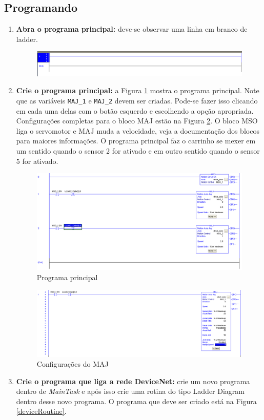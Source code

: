 \documentclass[a4paper,11pt]{scrartcl} %
\numberwithin{equation}{section} %
\numberwithin{figure}{section} %
\numberwithin{table}{section} %
\begin{document}
\subsection{Programando}
\begin{enumerate}
	\item \textbf{Abra o programa principal: } deve-se observar uma linha em branco de ladder.
	\begin{figure}[H]
       \centering
              \includegraphics[width=0.8\linewidth]{figures/software/step14}
          \end{figure}
     \item \textbf{Crie o programa principal: } a Figura \ref{mainRoutine} mostra o programa principal. Note que as variáveis \texttt{MAJ\_1} e \texttt{MAJ\_2} devem ser criadas. Pode-se fazer isso clicando em cada uma delas com o botão esquerdo e escolhendo a opção apropriada. Configurações completas para o bloco MAJ estão na Figura \ref{majConf}. O bloco MSO liga o servomotor e MAJ muda a velocidade, veja a documentação dos blocos para maiores informações. O programa principal faz o carrinho se mexer em um sentido quando o sensor 2 for ativado e em outro sentido quando o sensor 5 for ativado.
     \begin{figure}[H]
       \centering
              \includegraphics[width=0.9\linewidth]{figures/software/step16}
              \caption{Programa principal\label{mainRoutine}}
          \end{figure}
        \begin{figure}[H]
       \centering
              \includegraphics[width=0.9\linewidth]{figures/software/step15}
              \caption{Configurações do MAJ\label{majConf}}
          \end{figure}
     \item \textbf{Crie o programa que liga a rede DeviceNet: } crie um novo programa dentro de \textit{MainTask} e após isso crie uma rotina do tipo Ladder Diagram dentro desse novo programa. O programa que deve ser criado está na Figura \ref{deviceRoutine}.
     

\end{enumerate}
\end{document}
